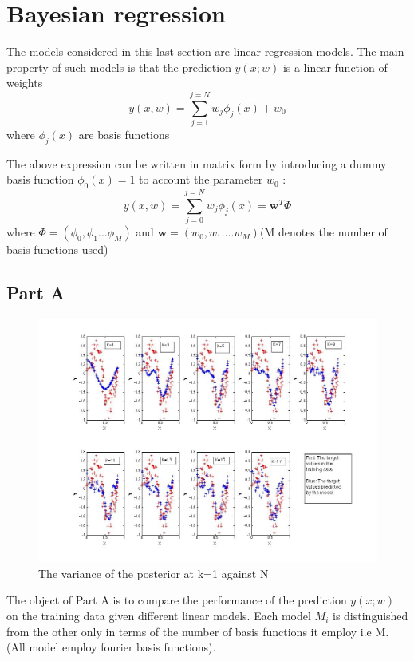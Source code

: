 \documentclass[14pt]{report}
\begin{document}
\section{Bayesian regression}
The models considered in this last section are  linear regression models. The main property of such models is that the prediction $y(x;w)$ is a linear function of weights 
\[ y(x,w) = \sum_{j=1}^{j=N} w_j\phi_j(x)    + w_0\] where $\phi_j(x)$ are basis functions

The above expression can be written in matrix form by introducing a dummy basis function  $\phi_0(x)=1$ to account the parameter $w_0$ :
\[ y(x,w) = \sum_{j=0}^{j=N} w_j\phi_j(x) =\textbf{w}^{T}\Phi \]
where $\Phi = (\phi_0,\phi_1...\phi_M)$ and $\textbf{w} =(w_0,w_1....w_M)$(M denotes the number of basis functions used)
\subsection{Part A}
\begin{figure}[h!]
  \caption{The variance of the posterior at k=1 against N }
  \centering
    \includegraphics[width=1\textwidth]{4A.jpg}
\end{figure}
The object of Part A is to compare the performance of the prediction $y(x;w)$ on the training data given different linear models. Each model $M_i$ is distinguished from the other only in terms of the number of basis functions it employ i.e M. (All model employ fourier basis functions).
\end{document}
